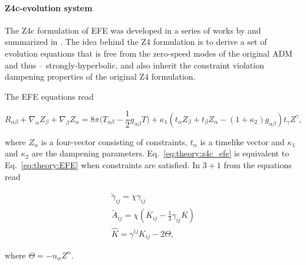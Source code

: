 \paragraph{Z4c-evolution system}

The Z4c formulation of \ac{EFE} was developed in a series of works by \citet{Bernuzzi:2009ex,Ruiz:2010qj,Weyhausen:2011cg,Cao:2011fu,Hilditch:2012fp} and 
summarized in \citet{Hilditch:2012fp}. 
%
The idea behind the Z4 formulation is to derive a set of evolution equations that is free from the 
zero-speed modes of the original \ac{ADM} and thus -- strongly-hyperbolic,
and also inherit the constraint violation dampening properties of the original Z4 formulation.

The \ac{EFE} equations read 

\begin{equation}
    R_{\alpha\beta} + \nabla_{\alpha}Z_{\beta} + \nabla_{\beta}Z_{\alpha} = 8\pi \Big( T_{\alpha\beta} - \frac{1}{2}g_{\alpha\beta}T \Big) + \kappa_1 (t_{\alpha} Z_{\beta} + t_{\beta}Z_{\alpha} - (1+\kappa_2)g_{\alpha\beta})t_{\gamma}Z^{\gamma},
    \label{eq:theory:z4c_efe}
\end{equation}

where $Z_{\alpha}$ is a four-vector consisting of constraints, $t_{\alpha}$ is a timelike vector and 
$\kappa_1$ and $\kappa_2$ are the dampening parameters.
Eq.~\eqref{eq:theory:z4c_efe} is equivalent to Eq.~\eqref{eq:theory:EFE} when constraints are satisfied.
%
In $3+1$ from the equations read 

\begin{align}
    \widetilde{\gamma}_{ij} = \chi\gamma_{ij} \label{eq:theory:z4c_1}\\
    \widetilde{A}_{ij} = \chi(K_{ij}-\frac{1}{3}\gamma_{ij}K)\label{eq:theory:z4c_2} \\
    \hat{K} = \gamma^{ij}K_{ij} - 2\Theta,\label{eq:theory:z4c_3}
\end{align}

where $\Theta=-n_{\alpha}Z^{\alpha}$.

